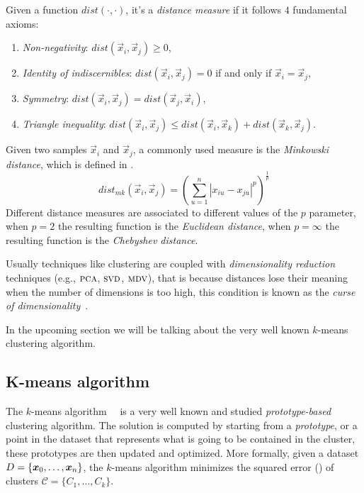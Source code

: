 Given a function $dist(\cdot, \cdot)$, it's a \emph{distance measure} if it follows $4$ fundamental
axioms:
\begin{enumerate}
	\item \emph{Non-negativity}: $dist(\vec{x}_i, \vec{x}_j) \geq 0$,
	\item \emph{Identity of indiscernibles}: $dist(\vec{x}_i, \vec{x}_j) = 0$ if and only if
		$\vec{x}_i = \vec{x}_j$,
	\item \emph{Symmetry}: $dist(\vec{x}_i, \vec{x}_j) = dist(\vec{x}_j, \vec{x}_i)$,
	\item \emph{Triangle inequality}: $dist(\vec{x}_i, \vec{x}_j) \leq dist(\vec{x}_i,
		\vec{x}_k) + dist(\vec{x}_k, \vec{x}_j)$.
\end{enumerate}
Given two samples $\vec{x}_i$ and $\vec{x}_j$, a commonly used measure is the \emph{Minkowski
distance}, which is defined in .
\begin{equation}
	\label{eq:mkd}
	dist_{mk}(\vec{x}_i, \vec{x}_j) = \left(\sum_{u = 1}^n|x_{iu} - x_{ju}|^p\right)^\frac{1}{p}
\end{equation}
Different distance measures are associated to different values of the $p$ parameter, when $p = 2$
the resulting function is the \emph{Euclidean distance}, when $p = \infty$ the resulting function is
the \emph{Chebyshev distance}.

Usually techniques like clustering are coupled with \emph{dimensionality reduction} techniques
(e.g., $\textsc{pca}$, $\textsc{svd}$, $\textsc{mdv}$), that is because distances lose their meaning
when the number of dimensions is too high, this condition is known as the \emph{curse of
dimensionality}~\cite{aggrawal2001}.

In the upcoming section we will be talking about the very well known $k$-means clustering algorithm.

\subsection{K-means algorithm}
The $k$-means algorithm~\cite{macqueen1967}~\cite{lloyd1982} is a very well known and studied
\emph{prototype-based} clustering algorithm. The solution is computed by starting from a \emph{prototype},
or a point in the dataset that represents what is going to be contained in the cluster, these
prototypes are then updated and optimized. More formally, given a dataset $D = \{\boldsymbol{x}_0, \ldots, \boldsymbol{x}_n\}$, the $k$-means
algorithm minimizes the squared error () of clusters $\mathcal{C} = \{C_1,
\ldots, C_k\}$.

